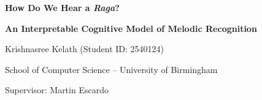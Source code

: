 \documentclass[11pt,a4paper]{article}
\begin{document}
\begin{center}
{\LARGE\bfseries How Do We Hear a \textit{Raga}?\par}
\vspace{0.4cm}
{\Large\bfseries An Interpretable Cognitive Model of Melodic Recognition\par}
\vspace{0.3cm}
{\large Krishnasree Kelath \quad (Student ID: 2540124)\par}
{\large School of Computer Science -- University of Birmingham\par}
{\large Supervisor: Martin Escardo\par}
\end{center}

\vspace{0.3cm}
\end{document}

